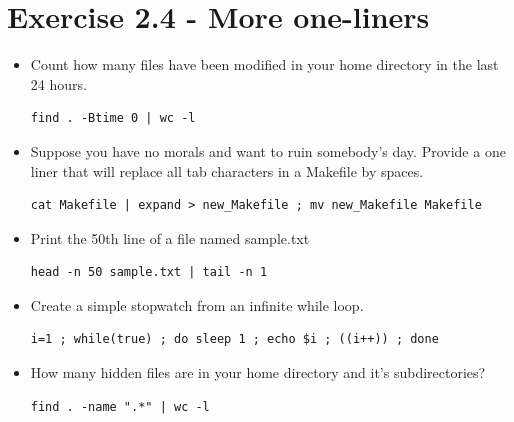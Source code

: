 \documentclass{article}
\begin{document}
\section{Exercise 2.4 - More one-liners}
\begin{itemize}
\item Count how many files have been modified in your home directory in the last 24 hours. 
\begin{verbatim}
find . -Btime 0 | wc -l 
\end{verbatim}

\item Suppose you have no morals and want to ruin somebody's day. Provide a one liner that will replace all tab characters in a Makefile by spaces.
\begin{verbatim}
cat Makefile | expand > new_Makefile ; mv new_Makefile Makefile
\end{verbatim}
\item Print the 50th line of a file named sample.txt 
\begin{verbatim}
head -n 50 sample.txt | tail -n 1
\end{verbatim}
\item Create a simple stopwatch from an infinite while loop. 
\begin{verbatim}
i=1 ; while(true) ; do sleep 1 ; echo $i ; ((i++)) ; done 
\end{verbatim}
\item How many hidden files are in your home directory and it's subdirectories?
\begin{verbatim}
find . -name ".*" | wc -l 
\end{verbatim}
\end{itemize}
	

 
\end{document}
